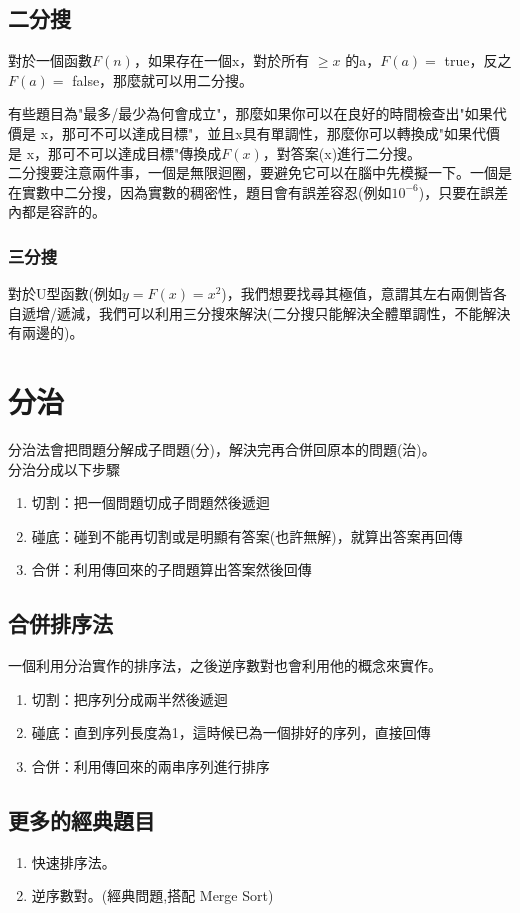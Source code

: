 \subsection{二分搜}
對於一個函數$F(n)$，如果存在一個x，對於所有 $\geq x$ 的a，$F(a)=$ true，反之$F(a)=$ false，那麼就可以用二分搜。

有些題目為"最多/最少為何會成立"，那麼如果你可以在良好的時間檢查出"如果代價是 x，那可不可以達成目標"，並且x具有單調性，那麼你可以轉換成"如果代價是 x，那可不可以達成目標"傳換成$F(x)$，對答案(x)進行二分搜。\\
二分搜要注意兩件事，一個是無限迴圈，要避免它可以在腦中先模擬一下。一個是在實數中二分搜，因為實數的稠密性，題目會有誤差容忍(例如$10^{-6}$)，只要在誤差內都是容許的。
\subsubsection{三分搜}
對於U型函數(例如$y=F(x)=x^2$)，我們想要找尋其極值，意謂其左右兩側皆各自遞增/遞減，我們可以利用三分搜來解決(二分搜只能解決全體單調性，不能解決有兩邊的)。

\section{分治}
分治法會把問題分解成子問題(分)，解決完再合併回原本的問題(治)。\\
分治分成以下步驟
\begin{enumerate}
\item 切割：把一個問題切成子問題然後遞迴
\item 碰底：碰到不能再切割或是明顯有答案(也許無解)，就算出答案再回傳
\item 合併：利用傳回來的子問題算出答案然後回傳
\end{enumerate}
\subsection{合併排序法}
一個利用分治實作的排序法，之後逆序數對也會利用他的概念來實作。
\begin{enumerate}
\item 切割：把序列分成兩半然後遞迴
\item 碰底：直到序列長度為1，這時候已為一個排好的序列，直接回傳
\item 合併：利用傳回來的兩串序列進行排序
\end{enumerate}
\subsection{更多的經典題目}
\begin{enumerate}
\item 快速排序法。
\item 逆序數對。(經典問題,搭配 Merge Sort)
\end{enumerate}
